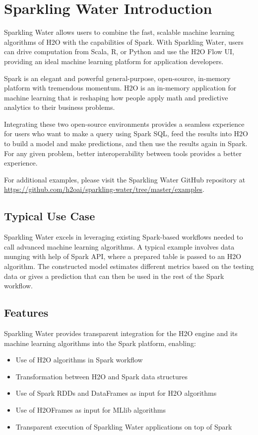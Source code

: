 \documentclass{standalone}
\begin{document}
\section{Sparkling Water Introduction}

Sparkling Water allows users to combine the fast, scalable machine learning algorithms of H2O with the capabilities of Spark. With Sparkling Water, users can drive computation from Scala, R, or Python and use the H2O Flow UI, providing an ideal machine learning platform for application developers.

Spark is an elegant and powerful general-purpose, open-source, in-memory platform with tremendous momentum. H2O is an in-memory application for machine learning that is reshaping how people apply math and predictive analytics to their business problems.

Integrating these two open-source environments provides a seamless experience for users who want to make a query using Spark SQL, feed the results into H2O to build a model and make predictions, and then use the results again in Spark. For any given problem, better interoperability between tools provides a better experience. 

For additional examples, please visit the Sparkling Water GitHub repository at {\url{https://github.com/h2oai/sparkling-water/tree/master/examples}}. 

\subsection{Typical Use Case}
Sparkling Water excels in leveraging existing Spark-based workflows needed to call advanced machine learning algorithms. A typical example involves data munging with help of Spark API, where a prepared table is passed to an H2O algorithm. The constructed model estimates different metrics based on the testing data or gives a prediction that can then be used in the rest of the Spark workflow.

\subsection{Features}

Sparkling Water provides transparent integration for the H2O engine and its machine learning algorithms into the Spark platform, enabling:

\begin{itemize}

 \item Use of H2O algorithms in Spark workflow
 \item Transformation between H2O and Spark data structures
 \item Use of Spark RDDs and DataFrames as input for H2O algorithms
 \item Use of H2OFrames as input for MLlib algorithms
 \item Transparent execution of Sparkling Water applications on top of Spark
\end{itemize}
\end{document}
